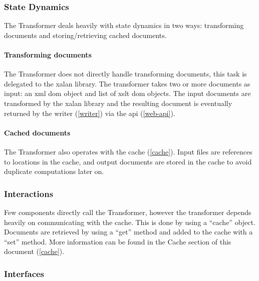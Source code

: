 \subsubsection{State Dynamics}

The Transformer deals heavily with state dynamics in two ways: transforming documents and storing/retrieving cached documents.

\paragraph{Transforming documents}

The Transformer does not directly handle transforming documents, this task is delegated to the \gls{xalan} library. \cite{xalan-library}
The transformer takes two or more documents as input: an \gls{xml} \gls{dom} object and list of \gls{xslt} \gls{dom} objects.
The input documents are transformed by the \gls{xalan} library and the resulting document is eventually returned by the writer (\ref{writer}) via the \gls{api} (\ref{web-api}).

\paragraph{Cached documents}

The Transformer also operates with the cache (\ref{cache}).
Input files are references to locations in the cache, and output documents are stored in the cache to avoid duplicate computations later on.

\subsubsection{Interactions}

Few components directly call the Transformer, however the transformer depends heavily on communicating with the cache.
This is done by using a ``cache'' object.
Documents are retrieved by using a ``get'' method and added to the cache with a ``set'' method.
More information can be found in the Cache section of this document (\ref{cache}).

\subsubsection{Interfaces}

